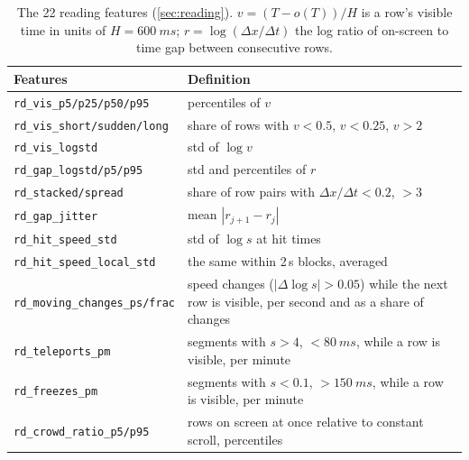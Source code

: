 \begin{table}[H]
\centering\footnotesize
\caption{The 22 reading features (\cref{sec:reading}). $v=(T-o(T))/H$ is a row's visible time in units of $H=\SI{600}{ms}$; $r=\log(\Delta x/\Delta t)$ the log ratio of on-screen to time gap between consecutive rows.}
\label{tab:reading}
\setlength\tabcolsep{4pt}
\begin{tabular}{p{}p{}}
\toprule
Features & Definition \\
\midrule
\texttt{rd\_vis\_p5/p25/p50/p95} & percentiles of $v$ \\
\texttt{rd\_vis\_short/sudden/long} & share of rows with $v<0.5$, $v<0.25$, $v>2$ \\
\texttt{rd\_vis\_logstd} & std of $\log v$ \\
\texttt{rd\_gap\_logstd/p5/p95} & std and percentiles of $r$ \\
\texttt{rd\_stacked/spread} & share of row pairs with $\Delta x/\Delta t<0.2$, $>3$ \\
\texttt{rd\_gap\_jitter} & mean $|r_{j+1}-r_j|$ \\
\texttt{rd\_hit\_speed\_std} & std of $\log s$ at hit times \\
\texttt{rd\_hit\_speed\_local\_std} & the same within 2\,s blocks, averaged \\
\texttt{rd\_moving\_changes\_ps/frac} & speed changes ($|\Delta\log s|>0.05$) while the next row is visible, per second and as a share of changes \\
\texttt{rd\_teleports\_pm} & segments with $s>4$, $<\SI{80}{ms}$, while a row is visible, per minute \\
\texttt{rd\_freezes\_pm} & segments with $s<0.1$, $>\SI{150}{ms}$, while a row is visible, per minute \\
\texttt{rd\_crowd\_ratio\_p5/p95} & rows on screen at once relative to constant scroll, percentiles \\
\bottomrule
\end{tabular}
\end{table}
